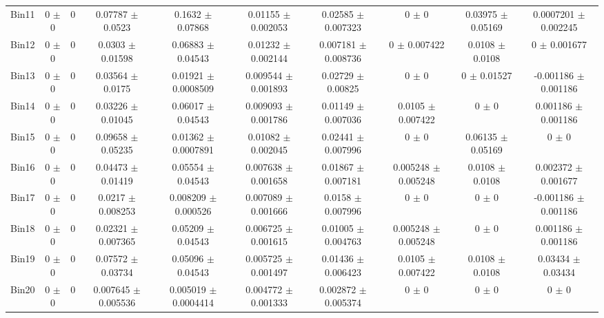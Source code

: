 \begin{tabular}{@{\extracolsep{4pt}}lccccccccc@{}}
     Bin11 & 0 $\pm$ 0 & 0 & 0.07787 $\pm$ 0.0523 & 0.1632 $\pm$ 0.07868 & 0.01155 $\pm$ 0.002053 & 0.02585 $\pm$ 0.007323 & 0 $\pm$ 0 & 0.03975 $\pm$ 0.05169 & 0.0007201 $\pm$ 0.002245 \\ 
     Bin12 & 0 $\pm$ 0 & 0 & 0.0303 $\pm$ 0.01598 & 0.06883 $\pm$ 0.04543 & 0.01232 $\pm$ 0.002144 & 0.007181 $\pm$ 0.008736 & 0 $\pm$ 0.007422 & 0.0108 $\pm$ 0.0108 & 0 $\pm$ 0.001677 \\ 
     Bin13 & 0 $\pm$ 0 & 0 & 0.03564 $\pm$ 0.0175 & 0.01921 $\pm$ 0.0008509 & 0.009544 $\pm$ 0.001893 & 0.02729 $\pm$ 0.00825 & 0 $\pm$ 0 & 0 $\pm$ 0.01527 & -0.001186 $\pm$ 0.001186 \\ 
     Bin14 & 0 $\pm$ 0 & 0 & 0.03226 $\pm$ 0.01045 & 0.06017 $\pm$ 0.04543 & 0.009093 $\pm$ 0.001786 & 0.01149 $\pm$ 0.007036 & 0.0105 $\pm$ 0.007422 & 0 $\pm$ 0 & 0.001186 $\pm$ 0.001186 \\ 
     Bin15 & 0 $\pm$ 0 & 0 & 0.09658 $\pm$ 0.05235 & 0.01362 $\pm$ 0.0007891 & 0.01082 $\pm$ 0.002045 & 0.02441 $\pm$ 0.007996 & 0 $\pm$ 0 & 0.06135 $\pm$ 0.05169 & 0 $\pm$ 0 \\ 
     Bin16 & 0 $\pm$ 0 & 0 & 0.04473 $\pm$ 0.01419 & 0.05554 $\pm$ 0.04543 & 0.007638 $\pm$ 0.001658 & 0.01867 $\pm$ 0.007181 & 0.005248 $\pm$ 0.005248 & 0.0108 $\pm$ 0.0108 & 0.002372 $\pm$ 0.001677 \\ 
     Bin17 & 0 $\pm$ 0 & 0 & 0.0217 $\pm$ 0.008253 & 0.008209 $\pm$ 0.000526 & 0.007089 $\pm$ 0.001666 & 0.0158 $\pm$ 0.007996 & 0 $\pm$ 0 & 0 $\pm$ 0 & -0.001186 $\pm$ 0.001186 \\ 
     Bin18 & 0 $\pm$ 0 & 0 & 0.02321 $\pm$ 0.007365 & 0.05209 $\pm$ 0.04543 & 0.006725 $\pm$ 0.001615 & 0.01005 $\pm$ 0.004763 & 0.005248 $\pm$ 0.005248 & 0 $\pm$ 0 & 0.001186 $\pm$ 0.001186 \\ 
     Bin19 & 0 $\pm$ 0 & 0 & 0.07572 $\pm$ 0.03734 & 0.05096 $\pm$ 0.04543 & 0.005725 $\pm$ 0.001497 & 0.01436 $\pm$ 0.006423 & 0.0105 $\pm$ 0.007422 & 0.0108 $\pm$ 0.0108 & 0.03434 $\pm$ 0.03434 \\ 
     Bin20 & 0 $\pm$ 0 & 0 & 0.007645 $\pm$ 0.005536 & 0.005019 $\pm$ 0.0004414 & 0.004772 $\pm$ 0.001333 & 0.002872 $\pm$ 0.005374 & 0 $\pm$ 0 & 0 $\pm$ 0 & 0 $\pm$ 0 \\ 
\hline\hline
  \end{tabular}

